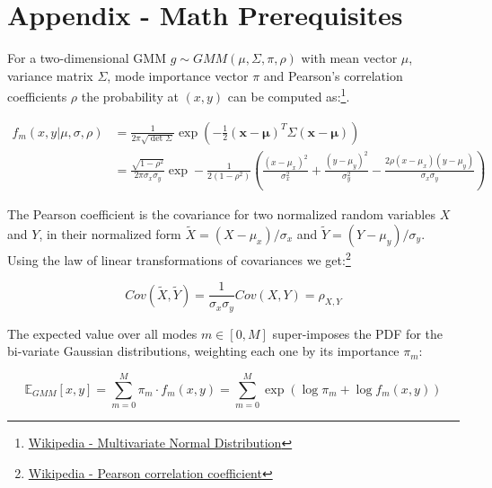 \chapter{Appendix - Math Prerequisites}
\label{appendix:gmm_log_prob}
For a two-dimensional \ac{GMM} $g \sim GMM(\mu, \Sigma, \pi, \rho)$ with mean vector $\mu$, variance matrix $\Sigma$, mode importance vector $\pi$ and Pearson's correlation coefficients $\rho$ the probability at $(x, y)$ can be computed as:\footnote{\href{https://de.wikipedia.org/wiki/Mehrdimensionale_Normalverteilung}{Wikipedia - Multivariate Normal Distribution}}.

\begin{align}
f_m(x, y | \mu, \sigma, \rho) 
&= \frac{1}{2 \pi \sqrt{\det \Sigma}} \exp \left(- \frac{1}{2} (\boldsymbol{x} - \boldsymbol{\mu})^T \Sigma (\boldsymbol{x} - \boldsymbol{\mu}) \right) \\
&= {\frac{\sqrt{1- \rho^2}}{2 \pi \sigma_x \sigma_y} 
\exp - \frac{1}{2 (1 - \rho^2)}} \left( \frac{( x - \mu _x)^2}{\sigma_x^2} +
\frac {(y - \mu_y)^2}{\sigma_y^2}-{\frac {2\rho (x - \mu_x)(y - \mu_y)}
{\sigma_x \sigma_y}} \right)	
\end{align}

The Pearson coefficient is the covariance for two normalized random variables $X$ and $Y$, in their normalized form $\tilde{X} = (X - \mu_x)/\sigma_x$ and $\tilde{Y} = (Y - \mu_y) / \sigma_y$. Using the law of linear transformations of covariances we get:\footnote{\href{https://en.wikipedia.org/wiki/Pearson_correlation_coefficient}{Wikipedia - Pearson correlation coefficient}} 

\begin{equation}
Cov(\tilde{X}, \tilde{Y}) = \frac{1}{\sigma_x \sigma_y} Cov(X, Y) = \rho_{X, Y}
\end{equation}

The expected value over all modes $m \in [0, M]$ super-imposes the \ac{PDF} for the bi-variate Gaussian distributions, weighting each one by its importance $\pi_m$:

\begin{equation}
\mathbb{E}_{GMM}[x, y] = \sum_{m=0}^M \pi_m \cdot f_m(x, y) =  \sum_{m=0}^M \exp \left( \log \pi_m + \log f_m(x, y) \right)	
\end{equation}


